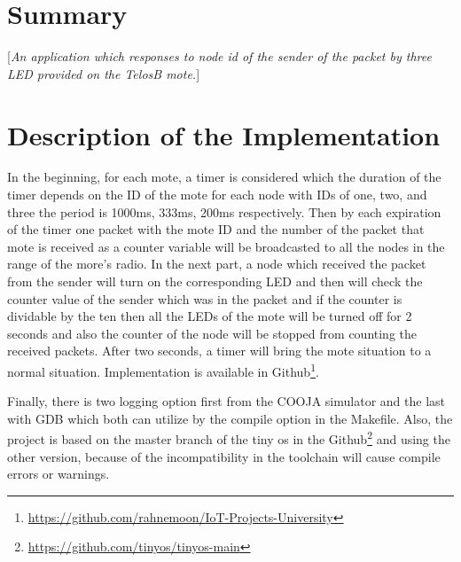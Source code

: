 \documentclass[10pt,english, openany]{book}
\begin{document}
\chapter{Summary}\label{chapt:sum}
[\textit{An application which responses to node id of the sender of the packet by three LED provided on the TelosB mote.}]
\chapter{Description of the Implementation}
In the beginning, for each mote, a timer is considered which the duration of the timer depends on the ID of the mote for each node with IDs of one, two, and three the period is 1000ms, 333ms, 200ms respectively. Then by each expiration of the timer one packet with the mote ID and the number of the packet that mote is received as a counter variable will be broadcasted to all the nodes in the range of the more's radio. In the next part, a node which received the packet from the sender will turn on the corresponding LED and then will check the counter value of the sender which was in the packet and if the counter is dividable by the ten then all the LEDs of the mote will be turned off for 2 seconds and also the counter of the node will be stopped from counting the received packets. After two seconds, a timer will bring the mote situation to a normal situation. Implementation is available in Github\footnote{\url{https://github.com/rahnemoon/IoT-Projects-University}}.\par
Finally, there is two logging option first from the COOJA simulator and the last with GDB which both can utilize by the compile option in the Makefile. Also, the project is based on the master branch of the tiny os in the Github\footnote{\url{https://github.com/tinyos/tinyos-main}} and using the other version, because of the incompatibility in the toolchain will cause compile errors or warnings.
\end{document}
